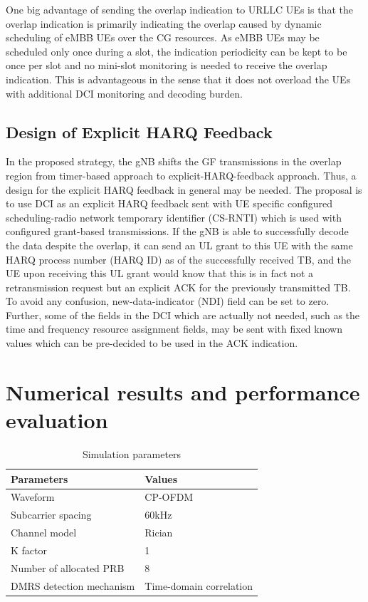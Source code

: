 \documentclass[conference]{IEEEtran}
\begin{document}
One big advantage of sending the overlap indication to URLLC UEs is that the overlap indication is primarily indicating the overlap caused by dynamic scheduling of eMBB UEs over the CG resources. As eMBB UEs may be scheduled only once during a slot, the indication periodicity can be kept to be once per slot and no mini-slot monitoring is needed to receive the overlap indication. This is advantageous in the sense that it does not overload the UEs with additional DCI monitoring and decoding burden. 

\subsection{Design of Explicit HARQ Feedback}\label{IIDD}
In the proposed strategy, the gNB shifts the GF transmissions in the overlap region from timer-based approach to explicit-HARQ-feedback approach. Thus, a design for the explicit HARQ feedback in general may be needed. The proposal is to use DCI as an explicit HARQ feedback sent with UE specific configured scheduling-radio network temporary identifier (CS-RNTI) which is used with configured grant-based transmissions. If the gNB is able to successfully decode the data despite the overlap, it can send an UL grant to this UE with the same HARQ process number (HARQ ID) as of the successfully received TB, and the UE upon receiving this UL grant would know that this is in fact not a retransmission request but an explicit ACK for the previously transmitted TB. To avoid any confusion, new-data-indicator (NDI) field can be set to zero. Further, some of the fields in the DCI which are actually not needed, such as the time and frequency resource assignment fields, may be sent with fixed known values which can be pre-decided to be used in the ACK indication.

\section{Numerical results and performance evaluation}\label{III}


\begin{table}[htbp]
\caption{Simulation parameters}
\begin{center}
\begin{tabular}{|p{8em}|p{8em}|}
 \hline
 \textbf{Parameters} & \textbf{Values}\\
 \hline
 Waveform & CP-OFDM\\
 \hline
 Subcarrier spacing & 60kHz\\
 \hline
 Channel model & Rician\\
 \hline
 K factor & 1\\
 \hline
 Number of allocated PRB & 8\\
 \hline
 DMRS detection mechanism & Time-domain correlation\\
 

 
 \hline
\end{tabular}
\label{tab1}
\end{center}
\vspace{-4mm}
\end{table}
\end{document}

